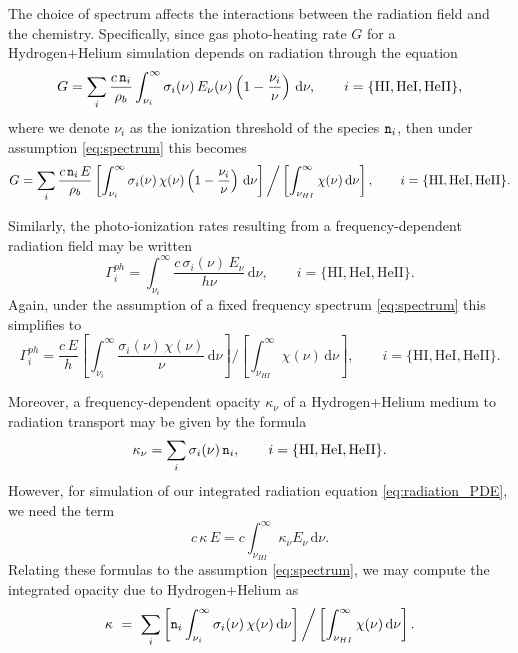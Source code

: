 \documentclass[letterpaper,10pt]{article}
\renewcommand{\(}{\left(}
\renewcommand{\)}{\right)}
\newcommand{\rhob}{\rho_b}
\newcommand{\mn}{{\tt n}}
\begin{document}
The choice of spectrum affects the interactions between the radiation
field and the chemistry.  Specifically, since gas photo-heating
rate $G$ for a Hydrogen+Helium simulation depends on radiation through
the equation 
\[
  G = \sum_{i} \frac{c\,\mn_{i}}{\rhob}
    \int_{\nu_{i}}^{\infty} \sigma_{i}(\nu)\, E_{\nu}(\nu)
    \left(1-\frac{\nu_{i}}{\nu}\right)\, \mathrm{d}\nu, 
    \qquad i = \{\text{HI}, \text{HeI}, \text{HeII}\},
\]
where we denote $\nu_{i}$ as the ionization threshold of the species
$\mn_i$, then under assumption \eqref{eq:spectrum} this becomes
\begin{equation}
  \label{eq:G_nLTE}
  G = \sum_{i} \frac{c\,\mn_{i}\,E}{\rhob} 
    \left[\int_{\nu_i}^{\infty} \sigma_i(\nu)\, \chi(\nu)
    \left(1-\frac{\nu_i}{\nu}\right)\, \mathrm{d}\nu\right] \bigg/
    \left[\int_{\nu_{HI}}^{\infty} \chi(\nu)\, \mathrm{d}\nu\right],
    \qquad i = \{\text{HI}, \text{HeI}, \text{HeII}\}.
\end{equation}

Similarly, the photo-ionization rates resulting from a
frequency-dependent radiation field may be written
\[
  \Gamma_i^{ph} = \int_{\nu_{i}}^{\infty} \frac{c\, \sigma_{i}(\nu)\,
    E_{\nu}}{h\nu}\, \mathrm{d}\nu,
    \qquad i = \{\text{HI}, \text{HeI}, \text{HeII}\}.
\]
Again, under the assumption of a fixed frequency spectrum
\eqref{eq:spectrum} this simplifies to
\begin{equation}
\label{eq:Gamma}
  \Gamma_i^{ph} = \frac{c\,E}{h}
  \left[\int_{\nu_{i}}^{\infty} \frac{\sigma_{i}(\nu)\,\chi(\nu)}{\nu}\,
    \mathrm{d}\nu\right] \bigg/
    \left[\int_{\nu_{HI}}^{\infty} \chi(\nu)\, \mathrm{d}\nu\right],
    \qquad i = \{\text{HI}, \text{HeI}, \text{HeII}\}.
\end{equation}

Moreover, a frequency-dependent opacity $\kappa_{\nu}$ of a
Hydrogen+Helium medium to radiation transport may be given by the
formula
\[
  \kappa_{\nu} = \sum_i \sigma_i(\nu)\, \mn_i, 
  \qquad i = \{\text{HI}, \text{HeI}, \text{HeII}\}.
\]
However, for simulation of our integrated radiation equation
\eqref{eq:radiation_PDE}, we need the term
\[
   c\,\kappa\,E = c\int_{\nu_{HI}}^{\infty} \kappa_{\nu}
   E_{\nu}\,\mathrm{d}\nu.
\]
Relating these formulas to the assumption \eqref{eq:spectrum}, we
may compute the integrated opacity due to Hydrogen+Helium as
\begin{equation}
\label{eq:opacityHI}
  \kappa \ = \ \sum_i
  \left[\mn_{i} \int_{\nu_{i}}^{\infty}
    \sigma_{i}(\nu)\,\chi(\nu)\,\mathrm{d}\nu\right] \bigg/
  \left[\int_{\nu_{HI}}^{\infty} \chi(\nu)\,\mathrm{d}\nu\right].
\end{equation}
\end{document}
